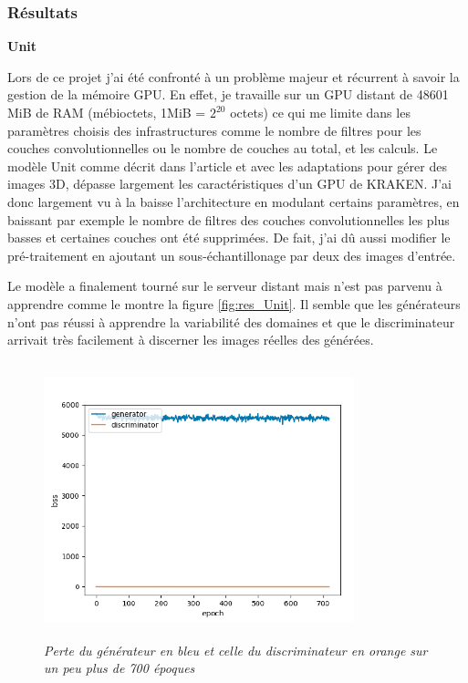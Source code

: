 \documentclass[12pt, oneside, a4paper, titlepage]{article}
\begin{document}
\vspace{5mm}

\subsubsection{Résultats}

\vspace{5mm}

\textbf{Unit} \\

\vspace{1mm}

Lors de ce projet j'ai été confronté à un problème majeur et récurrent à savoir la gestion de la mémoire GPU. 
En effet, je travaille sur un GPU distant de 48601 MiB de RAM (mébioctets, 1MiB = \(2^{20}\) octets) ce qui me limite dans les paramètres choisis des infrastructures comme le nombre de filtres pour les couches convolutionnelles ou le nombre de couches au total, et les calculs. Le modèle Unit comme décrit dans l'article et avec les adaptations pour gérer des images 3D, dépasse largement les caractéristiques d'un GPU de KRAKEN.
J'ai donc largement vu à la baisse l'architecture en modulant certains paramètres, en baissant par exemple le nombre de filtres des couches convolutionnelles les plus basses et certaines couches ont été supprimées.
De fait, j'ai dû aussi modifier le pré-traitement en ajoutant un sous-échantillonage par deux des images d'entrée.

\vspace{5mm}

Le modèle a finalement tourné sur le serveur distant mais n'est pas parvenu à apprendre comme le montre la figure \ref{fig:res_Unit}. Il semble que les générateurs n'ont pas réussi à apprendre la variabilité des domaines et que le discriminateur arrivait très facilement à discerner les images réelles des générées.

\begin{figure}[H]
    \centering
    \includegraphics[width=9cm, height=8cm]{loss_Unit.png}
    \caption{\textit{Perte du générateur en bleu et celle du discriminateur en orange sur un peu plus de 700 époques}}
    \label{fig:perte_Unit}
\end{figure}
\end{document}
